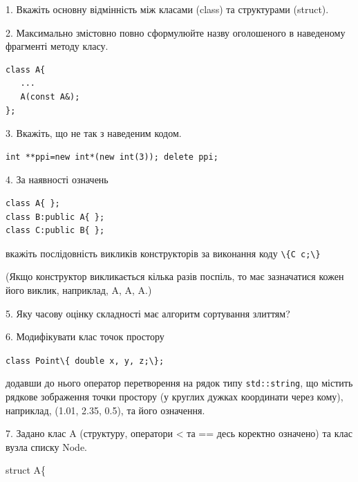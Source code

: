 \documentclass[12pt, ukrainian]{article}
\def\code#1{\Verb!#1!}
\begin{document}
{%
1. Вкажіть основну відмінність між класами (class) та структурами (struct).%
\par
\vspace{2mm}
2. Максимально змістовно повно сформулюйте назву оголошеного в наведеному фрагменті методу класу.
\vspace{-3mm}
\begin{verbatim}class A{
   ...
   A(const A&);
};\end{verbatim}
\vspace{-3mm}
\par
\vspace{2mm}
3. Вкажіть, що не так з наведеним кодом.
\vspace{-3mm}
\begin{verbatim}int **ppi=new int*(new int(3)); delete ppi;\end{verbatim}
\vspace{-3mm}
\par
\vspace{2mm}
4. За наявності означень
\vspace{-3mm}
\begin{verbatim}
class A{ };
class B:public A{ };
class C:public B{ };\end{verbatim}
\vspace{-3mm}
вкажіть послідовність викликів конструкторів за виконання коду \code{\{C c;\}} 

(Якщо конструктор викликається кілька разів поспіль, то має зазначатися кожен його виклик, наприклад, A, A, A.)

\vspace{2mm}
5. Яку часову оцінку складності має алгоритм сортування злиттям?
\par
\vspace{2mm}
6. Модифікувати клас точок простору 

\qquad\code{class Point\{ double x, y, z;\};}


додавши до нього оператор перетворення на рядок типу \code{std::string}, що містить рядкове зображення точки простору (у круглих дужках координати через кому), наприклад, (1.01, 2.35, 0.5), та його означення.%
\par
\vspace{2mm}
7. 
Задано клас A (структуру, оператори < та == десь коректно означено) та клас вузла списку Node.

struct A\{

}
\end{document}
